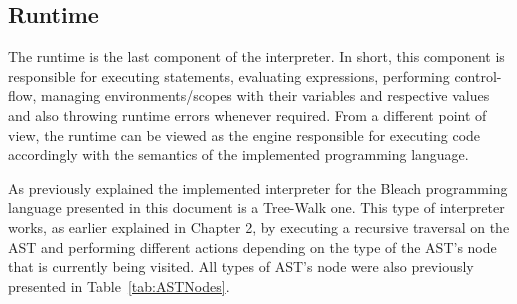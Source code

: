\subsection{Runtime}
The runtime is the last component of the interpreter. In short, this component is responsible for executing statements, evaluating expressions, performing control-flow, managing environments/scopes with their variables and respective values and also throwing runtime errors whenever required. From a different point of view, the runtime can be viewed as the engine responsible for executing code accordingly with the semantics of the implemented programming language.

As previously explained the implemented interpreter for the Bleach programming language presented in this document is a Tree-Walk one. This type of interpreter works, as earlier explained in Chapter 2, by executing a recursive traversal on the AST and performing different actions depending on the type of the AST's node that is currently being visited. All types of AST's node were also previously presented in Table~\ref{tab:ASTNodes}.


